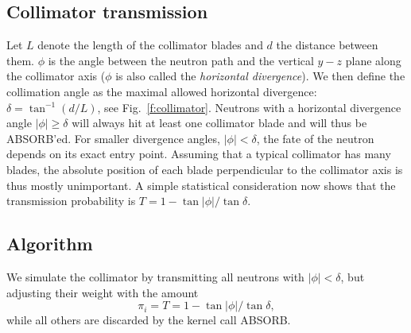 \subsection{Collimator transmission}
Let $L$ denote the length of the collimator blades
and $d$ the distance between them.
$\phi$ is the angle between the
neutron path and the vertical $y-z$ plane along the collimator axis
($\phi$ is also called the {\em horizontal divergence}).
We then define the collimation angle as the maximal allowed
horizontal divergence: $\delta = \tan^{-1}(d/L)$,
see Fig.~\ref{f:collimator}. Neutrons with a horizontal
divergence angle $|\phi| \geq \delta$ will always
hit at least one collimator blade and will thus be ABSORB'ed.
For smaller divergence angles, $|\phi| < \delta$, the fate of the
neutron depends on its exact entry point.
Assuming that a typical collimator has many blades, the
absolute position of each blade perpendicular to the collimator axis
is thus mostly unimportant.
A simple statistical consideration now shows that the transmission
probability is $T = 1-\tan|\phi|/\tan\delta$.

\subsection{Algorithm}
We simulate the collimator by transmitting all neutrons with
$|\phi| < \delta$, but adjusting their weight with the amount
\begin{equation}
\pi_i = T = 1-\tan|\phi|/ \tan\delta ,
\end{equation}
while all others are discarded by the kernel call ABSORB.
